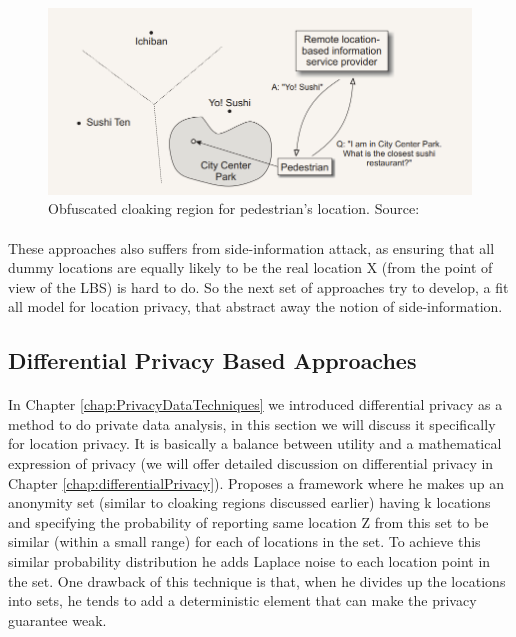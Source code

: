 \documentclass[12pt]{report}
\theoremstyle{named}
\begin{document}
\begin{figure}[ht]
\centering
        \includegraphics[width=120mm,scale=1]{Images/obfuscationRegion.PNG}
    \caption{Obfuscated cloaking region for pedestrian's location. Source:\cite{duckham2005formal}}
    \label{fig:obfuscationRegion}
\end{figure}

\paragraph{}
These approaches also suffers from side-information attack, as ensuring that all dummy locations are equally likely to be the real location X (from the point of view of the LBS) is hard to do. So the next set of approaches try to develop, a fit all model for location privacy, that abstract away the notion of side-information.



\subsection{Differential Privacy Based Approaches}
\paragraph{}
In Chapter \ref{chap:PrivacyDataTechniques} we introduced differential privacy as a method to do private data analysis, in this section we will discuss it specifically for location privacy. It is basically a balance between utility and a mathematical expression of privacy (we will offer detailed discussion on differential privacy in Chapter \ref{chap:differentialPrivacy}).
\cite{dewri2013local} Proposes a framework where he makes up an anonymity set (similar to cloaking regions discussed earlier) having k locations and specifying the probability of reporting same location Z from this set to be similar (within a small range) for each of locations in the set. To achieve this similar probability distribution he adds Laplace noise to each location point in the set. One drawback of this technique is that, when he divides up the locations into sets, he tends to add a deterministic element that can make the privacy guarantee weak. 
\end{document}
